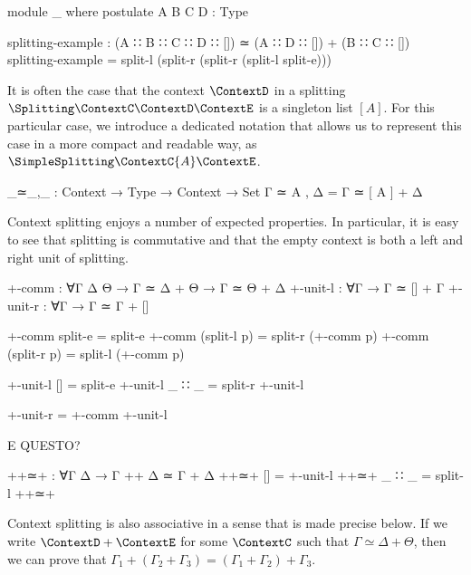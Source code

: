 \begin{code}[hide]
module _ where
  postulate A B C D : Type
\end{code}
\begin{code}
  splitting-example : (A ∷ B ∷ C ∷ D ∷ []) ≃ (A ∷ D ∷ []) + (B ∷ C ∷ [])
  splitting-example = split-l (split-r (split-r (split-l split-e)))
\end{code}

It is often the case that the context $\ContextD$ in a splitting
$\Splitting\ContextC\ContextD\ContextE$ is a singleton list $[A]$. For this
particular case, we introduce a dedicated notation that allows us to represent
this case in a more compact and readable way, as
$\SimpleSplitting\ContextC{A}\ContextE$.

\begin{code}
_≃_,_ : Context → Type → Context → Set
Γ ≃ A , Δ = Γ ≃ [ A ] + Δ
\end{code}

Context splitting enjoys a number of expected properties. In particular, it is
easy to see that splitting is commutative and that the empty context is both a
left and right unit of splitting.

\begin{code}
+-comm    : ∀{Γ Δ Θ} → Γ ≃ Δ + Θ → Γ ≃ Θ + Δ
+-unit-l  : ∀{Γ} → Γ ≃ [] + Γ
+-unit-r  : ∀{Γ} → Γ ≃ Γ + []
\end{code}
\begin{code}[hide]
+-comm split-e = split-e
+-comm (split-l p) = split-r (+-comm p)
+-comm (split-r p) = split-l (+-comm p)

+-unit-l {[]} = split-e
+-unit-l {_ ∷ _} = split-r +-unit-l

+-unit-r = +-comm +-unit-l
\end{code}

E QUESTO?
\begin{code}
++≃+ : ∀{Γ Δ} → Γ ++ Δ ≃ Γ + Δ
++≃+ {[]} = +-unit-l
++≃+ {_ ∷ _} = split-l ++≃+
\end{code}

Context splitting is also associative in a sense that is made precise below. If
we write $\ContextD + \ContextE$ for some $\ContextC$ such that $Γ ≃ Δ + Θ$, then
we can prove that $Γ_1 + (Γ_2 + Γ_3) = (Γ_1 + Γ_2) + Γ_3$.

